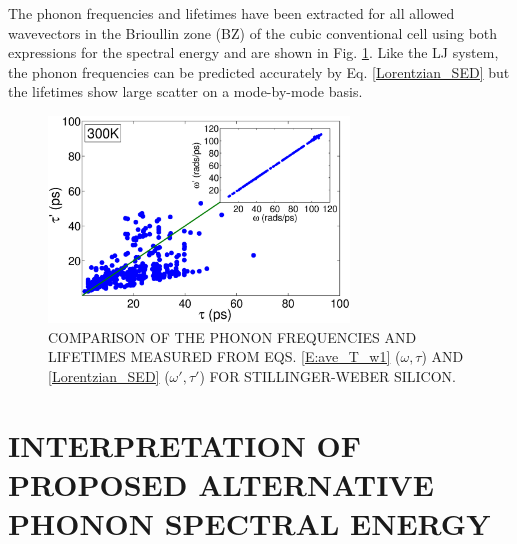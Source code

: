 \documentclass[twocolumn,10pt]{asme2e}
\begin{document}
The phonon frequencies and lifetimes have been extracted for all allowed wavevectors in the Brioullin zone (BZ) of the cubic conventional cell using both expressions for the spectral energy and are shown in Fig. \ref{F:FREQ_LIFE_Si}. Like the LJ system, the phonon frequencies can be predicted accurately by Eq$.$ \eqref{Lorentzian_SED} but the lifetimes show large scatter on a mode-by-mode basis.

\begin{figure}
\includegraphics[angle=0,width=80.0mm]{Si_NMD_SED_2.eps}
\caption{\label{F:FREQ_LIFE_Si} COMPARISON OF THE PHONON FREQUENCIES AND LIFETIMES MEASURED FROM EQS$.$ \eqref{E:ave_T_w1} ($\omega,\tau$) AND  \eqref{Lorentzian_SED} ($\omega',\tau'$) FOR STILLINGER-WEBER SILICON.}
\end{figure}

\section*{INTERPRETATION OF PROPOSED ALTERNATIVE PHONON SPECTRAL ENERGY}\label{S:Interpretation}
\end{document}
